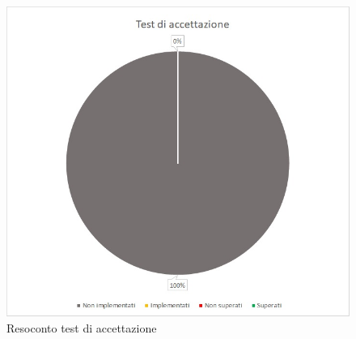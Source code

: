 \normalsize
\renewcommand{\arraystretch}{1}
\begin{figure} [H]
	\centering
	\includegraphics[scale=1]{Img/TA}
	\caption{Resoconto test di accettazione}\label{}
\end{figure}
\newpage

